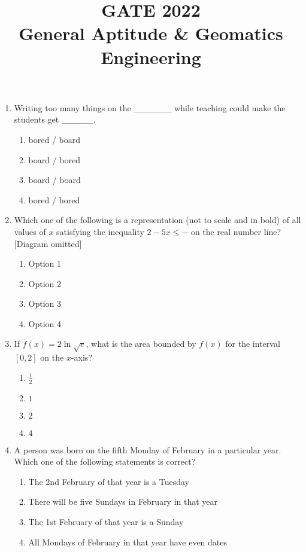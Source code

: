 \documentclass[12pt,a4paper]{article}
\begin{document}
\title{GATE 2022 \\ General Aptitude \& Geomatics Engineering}
\author{}
\date{}
\maketitle

\begin{enumerate}

\item Writing too many things on the \_\_\_\_\_\_ while teaching could make the students get \_\_\_\_\_.
\begin{enumerate}
    \item bored / board
    \item board / bored
    \item board / board
    \item bored / bored
\end{enumerate}

\item Which one of the following is a representation (not to scale and in bold) of all values of $x$ satisfying the inequality $2 - 5x \le -$ on the real number line? [Diagram omitted]
\begin{enumerate}
    \item Option 1
    \item Option 2
    \item Option 3
    \item Option 4
\end{enumerate}

\item If $f(x) = 2 \ln \sqrt{e}$, what is the area bounded by $f(x)$ for the interval $[0, 2]$ on the $x$-axis?
\begin{enumerate}
    \item $\frac{1}{2}$
    \item $1$
    \item $2$
    \item $4$
\end{enumerate}

\item A person was born on the fifth Monday of February in a particular year. Which one of the following statements is correct?
\begin{enumerate}
    \item The 2nd February of that year is a Tuesday
    \item There will be five Sundays in February in that year
    \item The 1st February of that year is a Sunday
    \item All Mondays of February in that year have even dates
\end{enumerate}


\end{enumerate}
\end{document}
